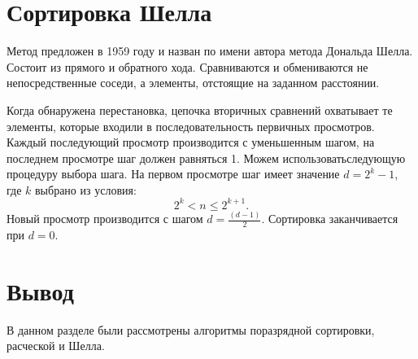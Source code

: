 \section{Сортировка Шелла}
Метод предложен в 1959 году и назван по имени автора метода Дональда Шелла.
Состоит из прямого и обратного хода. 
Сравниваются и обмениваются не непосредственные соседи, а элементы, отстоящие на заданном расстоянии. 

Когда обнаружена перестановка, цепочка вторичных сравнений охватывает те элементы, которые входили в последовательность первичных просмотров.
Каждый последующий просмотр производится с уменьшенным шагом, на последнем просмотре шаг должен равняться 1. 
Можем использоватьследующую процедуру выбора шага. 
На первом просмотре шаг имеет значение $d = 2^{k} - 1$, где $k$ выбрано из условия: \[2^{k} < n \le 2^{k + 1}.\] 
Новый просмотр производится с шагом $d = \frac{(d - 1)}{2}$. Сортировка заканчивается при $d = 0$.~\cite{shell}

\section*{Вывод}
В данном разделе были рассмотрены алгоритмы поразрядной сортировки, расческой и Шелла.